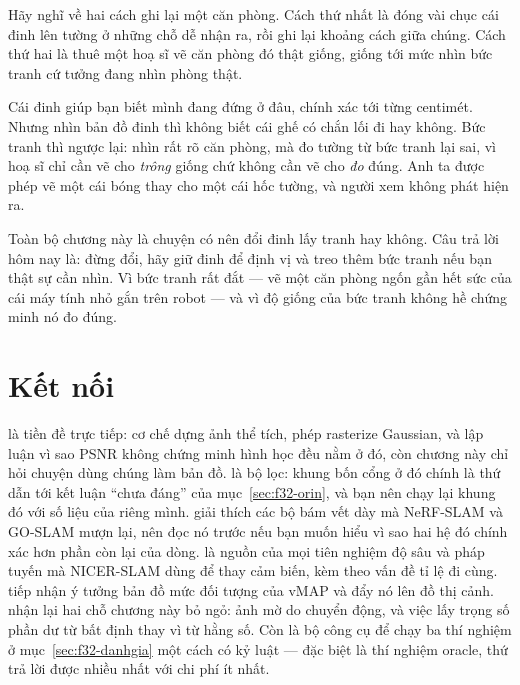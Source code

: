 \documentclass[../../deep_learning.tex]{subfiles}
\begin{document}
\begin{dongian}
Hãy nghĩ về hai cách ghi lại một căn phòng. Cách thứ nhất là đóng vài chục cái đinh lên tường ở những chỗ dễ nhận ra, rồi ghi lại khoảng cách giữa chúng. Cách thứ hai là thuê một hoạ sĩ vẽ căn phòng đó thật giống, giống tới mức nhìn bức tranh cứ tưởng đang nhìn phòng thật.

Cái đinh giúp bạn biết mình đang đứng ở đâu, chính xác tới từng centimét. Nhưng nhìn bản đồ đinh thì không biết cái ghế có chắn lối đi hay không. Bức tranh thì ngược lại: nhìn rất rõ căn phòng, mà đo tường từ bức tranh lại sai, vì hoạ sĩ chỉ cần vẽ cho \emph{trông} giống chứ không cần vẽ cho \emph{đo} đúng. Anh ta được phép vẽ một cái bóng thay cho một cái hốc tường, và người xem không phát hiện ra.

Toàn bộ chương này là chuyện có nên đổi đinh lấy tranh hay không. Câu trả lời hôm nay là: đừng đổi, hãy giữ đinh để định vị và treo thêm bức tranh nếu bạn thật sự cần nhìn. Vì bức tranh rất đắt --- vẽ một căn phòng ngốn gần hết sức của cái máy tính nhỏ gắn trên robot --- và vì độ giống của bức tranh không hề chứng minh nó đo đúng.

\end{dongian}

\section{Kết nối}
 là tiền đề trực tiếp: cơ chế dựng ảnh thể tích, phép rasterize Gaussian, và lập luận vì sao PSNR không chứng minh hình học đều nằm ở đó, còn chương này chỉ hỏi chuyện dùng chúng làm bản đồ.  là bộ lọc: khung bốn cổng ở đó chính là thứ dẫn tới kết luận ``chưa đáng'' của mục~\ref{sec:f32-orin}, và bạn nên chạy lại khung đó với số liệu của riêng mình.  giải thích các bộ bám vết dày mà NeRF-SLAM và GO-SLAM mượn lại, nên đọc nó trước nếu bạn muốn hiểu vì sao hai hệ đó chính xác hơn phần còn lại của dòng.  là nguồn của mọi tiên nghiệm độ sâu và pháp tuyến mà NICER-SLAM dùng để thay cảm biến, kèm theo vấn đề tỉ lệ đi cùng.  tiếp nhận ý tưởng bản đồ mức đối tượng của vMAP và đẩy nó lên đồ thị cảnh.  nhận lại hai chỗ chương này bỏ ngỏ: ảnh mờ do chuyển động, và việc lấy trọng số phần dư từ bất định thay vì từ hằng số. Còn  là bộ công cụ để chạy ba thí nghiệm ở mục~\ref{sec:f32-danhgia} một cách có kỷ luật --- đặc biệt là thí nghiệm oracle, thứ trả lời được nhiều nhất với chi phí ít nhất.
\end{document}
